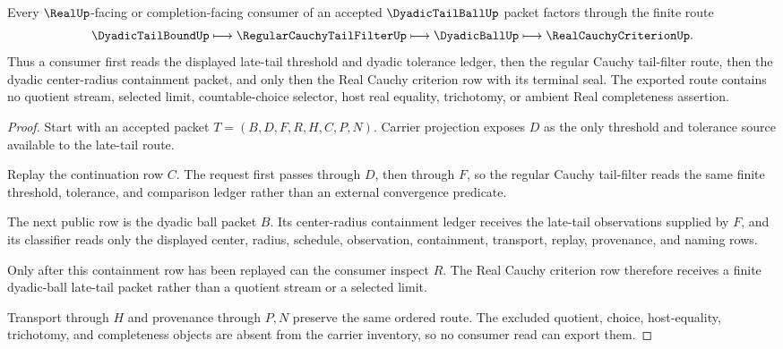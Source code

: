 \begin{theorem}
\label{thm:dyadic-tail-ball-regular-cauchy-consumer-route}
Every $\RealUp$-facing or completion-facing consumer of an accepted $\DyadicTailBallUp$ packet factors through the finite route
$$
\DyadicTailBoundUp \longmapsto \RegularCauchyTailFilterUp \longmapsto \DyadicBallUp \longmapsto \RealCauchyCriterionUp .
$$
Thus a consumer first reads the displayed late-tail threshold and dyadic tolerance ledger, then the regular Cauchy tail-filter route, then the dyadic center-radius containment packet, and only then the Real Cauchy criterion row with its terminal seal. The exported route contains no quotient stream, selected limit, countable-choice selector, host real equality, trichotomy, or ambient Real completeness assertion.
\end{theorem}
\begin{proof}
Start with an accepted packet $T=(B,D,F,R,H,C,P,N)$. Carrier projection exposes $D$ as the only threshold and tolerance source available to the late-tail route.

Replay the continuation row $C$. The request first passes through $D$, then through $F$, so the regular Cauchy tail-filter reads the same finite threshold, tolerance, and comparison ledger rather than an external convergence predicate.

The next public row is the dyadic ball packet $B$. Its center-radius containment ledger receives the late-tail observations supplied by $F$, and its classifier reads only the displayed center, radius, schedule, observation, containment, transport, replay, provenance, and naming rows.

Only after this containment row has been replayed can the consumer inspect $R$. The Real Cauchy criterion row therefore receives a finite dyadic-ball late-tail packet rather than a quotient stream or a selected limit.

Transport through $H$ and provenance through $P,N$ preserve the same ordered route. The excluded quotient, choice, host-equality, trichotomy, and completeness objects are absent from the carrier inventory, so no consumer read can export them.
\end{proof}

